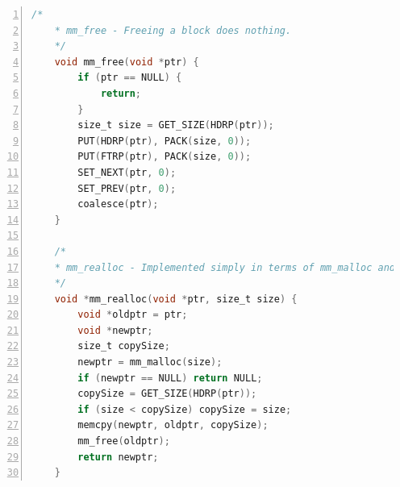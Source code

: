 \documentclass{article}
\begin{document}
\begin{lstlisting}[xleftmargin = 4em,xrightmargin = 3em, aboveskip = 1em, numbers = left, language = C]
    /*
    * mm_free - Freeing a block does nothing.
    */
    void mm_free(void *ptr) {
        if (ptr == NULL) {
            return;
        }
        size_t size = GET_SIZE(HDRP(ptr));
        PUT(HDRP(ptr), PACK(size, 0));
        PUT(FTRP(ptr), PACK(size, 0));
        SET_NEXT(ptr, 0);
        SET_PREV(ptr, 0);
        coalesce(ptr);
    }

    /*
    * mm_realloc - Implemented simply in terms of mm_malloc and mm_free
    */
    void *mm_realloc(void *ptr, size_t size) {
        void *oldptr = ptr;
        void *newptr;
        size_t copySize;
        newptr = mm_malloc(size);
        if (newptr == NULL) return NULL;
        copySize = GET_SIZE(HDRP(ptr));
        if (size < copySize) copySize = size;
        memcpy(newptr, oldptr, copySize);
        mm_free(oldptr);
        return newptr;
    }

\end{lstlisting}
\normalsize
\end{document}
